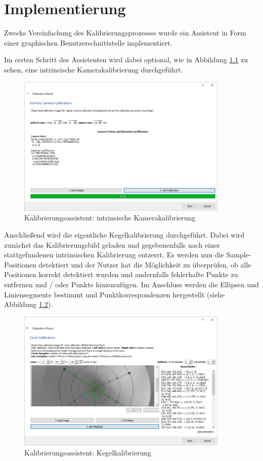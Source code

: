 \chapter{Implementierung}
\label{ch:implementation}

Zwecks Vereinfachung des Kalibrierungsprozesses wurde ein Assistent in Form einer graphischen Benutzerschnittstelle implementiert. 

Im ersten Schritt des Assistenten wird dabei optional, wie in Abbildung \ref{fig:wizard1} zu sehen, eine intrinsische Kamerakalibrierung durchgeführt. 
\begin{figure}[!htb]
	\centering
	\includegraphics[width=0.9\textwidth]{images/GUI/calibWizard1_1.PNG}
	\caption{Kalibrierungsassistent: intrinsische Kamerakalibrierung}
	\label{fig:wizard1}
\end{figure}

Anschließend wird die eigentliche Kegelkalibrierung durchgeführt. Dabei wird zunächst das Kalibrierungsbild geladen und gegebenenfalls nach einer stattgefundenen intrinsischen Kalibrierung entzerrt. Es werden nun die Sample-Positionen detektiert und der Nutzer hat die Möglichkeit zu überprüfen, ob alle Positionen korrekt detektiert wurden und andernfalls fehlerhafte Punkte zu entfernen und / oder Punkte hinzuzufügen. Im Anschluss werden die Ellipsen und Liniensegmente bestimmt und Punktkorrespondenzen hergestellt (siehe Abbildung \ref{fig:wizard2}).

\begin{figure}[!htb]
	\centering
	\includegraphics[width=0.9\textwidth]{images/GUI/calibWizard2_1.PNG}
	\caption{Kalibrierungsassistent: Kegelkalibrierung}
	\label{fig:wizard2}
\end{figure}

